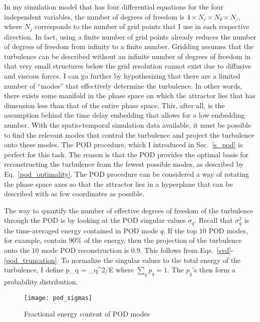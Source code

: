 In my simulation model that has four differential
equations for the four independent variables, the number of degrees of freedom is $4 \times N_r \times N_\theta \times N_z$, where $N_j$ corresponds to the number of grid points that I use in each
respective direction. In fact, using a finite number of grid points already reduces the number of degrees of freedom from infinity to a finite number. Gridding assumes that the turbulence
can be described without an infinite number of degrees of freedom in that very small structures below the grid resolution cannot exist due to diffusive and viscous forces. 
I can go further by hypothesizing that there are a limited number of ``modes'' that effectively determine the turbulence. 
In other words, there exists some manifold in the phase space on which the attractor lies that has dimension less than that of the entire phase space. This, after all, is the assumption behind
the time delay embedding that allows for a low embedding number. With the spatio-temporal simulation data available, it must be possible to find the relevant modes that control the turbulence
and project the turbulence onto these modes. The POD procedure, which I introduced in Sec.~\ref{s_pod} is perfect for this task. The reason is that the POD provides the optimal basis for
reconstructing the turbulence from the fewest possible modes, as described by Eq.~\ref{pod_optimality}. The POD procedure can be considered a way of rotating the phase space axes so that
the attractor lies in a hyperplane that can be described with as few coordinates as possible.

The way to quantify the number of effective degrees of freedom of the turbulence through the POD is by looking at the POD singular values $\sigma_q$. Recall that $\sigma_q^2$ is the time-averaged
energy contained in POD mode $q$. If the top $10$ POD modes, for example, contain $90\%$ of the energy, then the projection of the turbulence onto the $10$ mode POD reconstruction
is $0.9$. This follows from Eqs.~\ref{svd}-\ref{pod_truncation}. To normalize the singular values to the total energy
of the turbulence, I define
\beq
\label{pj_def}
p_q = \sigma_q^2/E
\eeq
where $\sum_q p_q = 1$. The $p_q$'s then form a probability distribution. 

\begin{figure}
\centerline{\texttt{[image: pod\_sigmas]}}
\caption{Fractional energy content of POD modes}
\label{pod_sigmas}
\end{figure}

